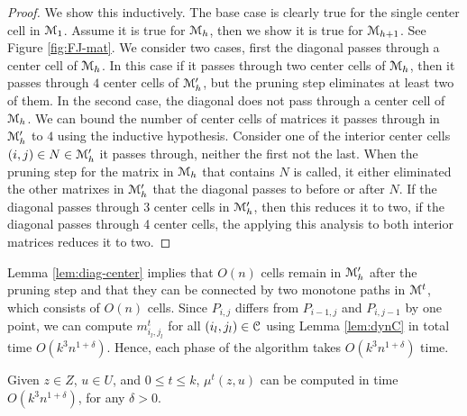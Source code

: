 \documentclass[11pt]{myclass}
\newcommand{\EuM}{\ensuremath{\EuScript{M}}}
\newcommand{\EuC}{\ensuremath{\EuScript{C}}}
\begin{document}
\begin{proof}
We show this inductively.  The base case is clearly true for the single center cell in $\EuM_1$.  
Assume it is true for $\EuM_h$, then we show it is true for $\EuM_{h+1}$.  
See Figure \ref{fig:FJ-mat}.
We consider two cases, first the diagonal passes through a center cell of $\EuM_h$.  
In this case if it passes through two center cells of $\EuM_h$, then it passes through $4$ center cells of $\EuM^\prime_h$, but the pruning step eliminates at least two of them.  
In the second case, the diagonal does not pass through a center cell of $\EuM_h$.  We can bound the number of center cells of matrices it passes through in $\EuM^\prime_h$ to $4$ using the inductive hypothesis.  
Consider one of the interior center cells $(i,j) \in N \in \EuM^\prime_h$ it passes through, neither the first not the last.  When the pruning step for the matrix in $\EuM_h$ that contains $N$ is called, it either eliminated the other matrixes in $\EuM_h^\prime$ that the diagonal passes to before or after $N$.  If the diagonal passes through 3 center cells in $\EuM_h^\prime$, then this reduces it to two, if the diagonal passes through 4 center cells, the applying this analysis to both interior matrices reduces it to two.  
\end{proof}

Lemma \ref{lem:diag-center} implies that $O(n)$ cells remain in $\EuM^\prime_h$ after the pruning step and that they can be connected by two monotone paths in $\EuM^t$, which consists of $O(n)$ cells.
Since $P_{i,j}$ differs from $P_{i-1,j}$ and $P_{i,j-1}$ by one point, we can compute $m^t_{i_l,j_l}$ for all $(i_l,j_l) \in \EuC$ using 
Lemma \ref{lem:dynC} in total time $O(k^3 n^{1+\delta})$.
Hence, each phase of the algorithm takes $O(k^3 n^{1+\delta})$ time.  

\begin{lemma}
Given $z \in Z$, $u \in U$, and $0 \leq t \leq k$, 
$\mu^t(z,u)$ can be computed in time $O(k^3 n^{1+\delta})$, for any $\delta > 0$.  
\end{lemma}
\end{document}
